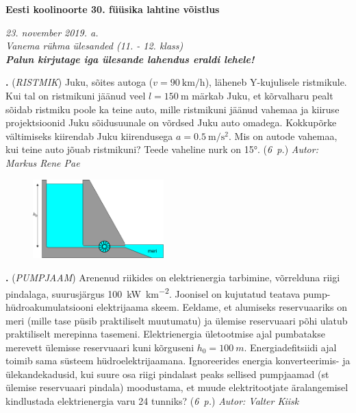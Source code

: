 \documentclass[11pt,a5paper]{article}
\newcommand{\numb}[1]{\vspace{5pt}\textbf{\large #1}}
\newcommand{\nimi}[1]{(\textsl{\small #1})}
\newcommand{\punktid}[1]{(\emph{#1~p.})}
\newcommand{\autor}[1]{\emph{ Autor: #1}}
\newcounter{ylesanne}
\newcommand{\yl}[1]{\addtocounter{ylesanne}{1}\numb{\theylesanne.} \nimi{#1} \newblock{}}
\begin{document}
\begin{center}
\textbf{\Large Eesti koolinoorte 30. füüsika lahtine võistlus} \vspace{3pt}

\emph{23. november 2019. a. \\Vanema rühma ülesanded (11. - 12. klass)}\vspace{2pt}\\
\emph{\textbf{Palun kirjutage iga ülesande lahendus eraldi lehele!}}
\end{center}
\vspace{-5pt}

\yl{RISTMIK}
Juku, sõites autoga ($v = \SI{90}{\kilo\meter\per\hour}$), läheneb Y-kujulisele ristmikule. Kui tal on ristmikuni jäänud veel $l = \SI{150}{\meter}$ märkab Juku, et kõrvalharu pealt sõidab ristmiku poole ka teine auto, mille ristmikuni jäänud vahemaa ja kiiruse projektsioonid Juku sõidusuunale on võrdsed Juku auto omadega. Kokkupõrke vältimiseks kiirendab Juku kiirendusega $a = \SI{0.5}{\meter\per\second\squared}$. Mis on autode vahemaa, kui teine auto jõuab ristmikuni? Teede vaheline nurk on \ang{15}.
\punktid{6} \autor{Markus Rene Pae}

\begin{figure}
    \vspace{-23pt}
	\includegraphics[width=0.45\textwidth]{pumpjaama_joonis.pdf}
\end{figure}

\yl{PUMPJAAM}
Arenenud riikides on elektrienergia tarbimine, võrrelduna riigi pindalaga, suurusjärgus \SI{100}{\kilo\watt\per\kilo\meter\squared}. Joonisel on kujutatud teatava pump-hüdroakumulatsiooni elektrijaama skeem. Eeldame, et alumiseks reservuaariks on meri (mille tase püsib praktiliselt muutumatu) ja ülemise reservuaari põhi ulatub praktiliselt merepinna tasemeni. Elektrienergia ületootmise ajal pumbatakse merevett ülemisse reservuaari kuni kõrguseni $h_0=\SI{100}{m}$. Energiadefitsiidi ajal toimib sama süsteem hüdroelektrijaamana. Ignoreerides energia konverteerimis- ja ülekandekadusid, kui suure osa riigi pindalast peaks sellised pumpjaamad (st ülemise reservuaari pindala) moodustama, et muude elektritootjate äralangemisel kindlustada elektrienergia varu 24 tunniks?
\punktid{6} \autor{Valter Kiisk}
\end{document}
